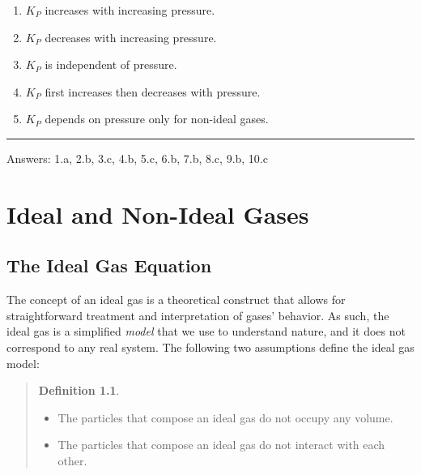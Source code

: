 \documentclass[
  9pt,
]{extbook}
\providecommand{\tightlist}{%
  \setlength{\itemsep}{0pt}\setlength{\parskip}{0pt}}
\theoremstyle{definition}
\newtheorem{definition}{Definition}[chapter]
\theoremstyle{definition}
\theoremstyle{definition}
\theoremstyle{definition}
\theoremstyle{remark}
\begin{document}
\begin{enumerate}
\def\labelenumi{\alph{enumi}.}
\tightlist
\item
  \(K_P\) increases with increasing pressure.
\item
  \(K_P\) decreases with increasing pressure.
\item
  \(K_P\) is independent of pressure.
\item
  \(K_P\) first increases then decreases with pressure.
\item
  \(K_P\) depends on pressure only for non-ideal gases.
\end{enumerate}

\begin{center}\rule{0.5\linewidth}{0.5pt}\end{center}

Answers: 1.a, 2.b, 3.c, 4.b, 5.c, 6.b, 7.b, 8.c, 9.b, 10.c

\renewcommand*{\standardstate}{{-\kern-6pt{\ominus}\kern-6pt-}}

\chapter{Ideal and Non-Ideal Gases}\label{RealGases}

\section{The Ideal Gas Equation}\label{the-ideal-gas-equation}

The concept of an ideal gas is a theoretical construct that allows for straightforward treatment and interpretation of gases' behavior. As such, the ideal gas is a simplified \emph{model} that we use to understand nature, and it does not correspond to any real system. The following two assumptions define the ideal gas model:

\begin{quote}
\begin{definition}
\protect\hypertarget{def:iedalgasdef}{}\label{def:iedalgasdef}\leavevmode

\begin{itemize}
\tightlist
\item
  The particles that compose an ideal gas do not occupy any volume.
\item
  The particles that compose an ideal gas do not interact with each other.
\end{itemize}

\end{definition}
\end{quote}
\end{document}
